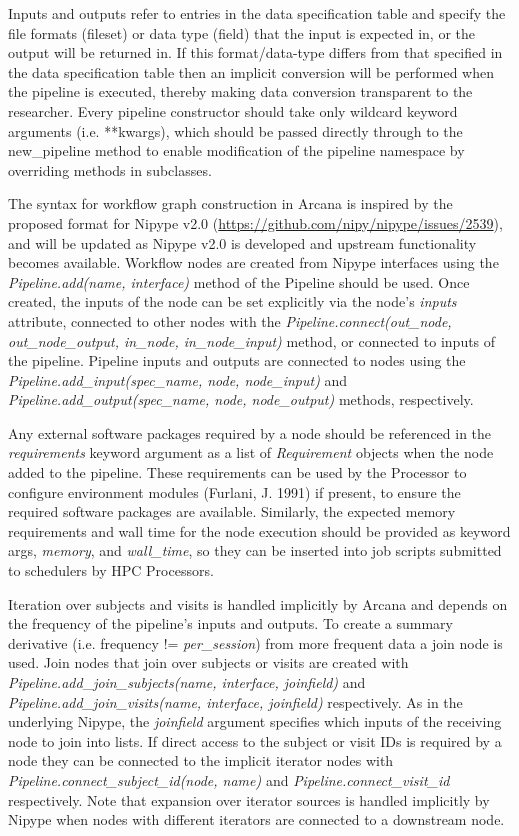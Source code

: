 Inputs and outputs refer to entries in the data specification table and
specify the file formats (fileset) or data type (field) that the input
is expected in, or the output will be returned in. If this
format/data-type differs from that specified in the data specification
table then an implicit conversion will be performed when the pipeline is
executed, thereby making data conversion transparent to the researcher.
Every pipeline constructor should take only wildcard keyword arguments
(i.e. **kwargs), which should be passed directly through to the
new\_pipeline method to enable modification of the pipeline namespace by
overriding methods in subclasses.

The syntax for workflow graph construction in Arcana is inspired by the
proposed format for Nipype v2.0
(\href{https://github.com/nipy/nipype/issues/2539}{{https://github.com/nipy/nipype/issues/2539}}),
and will be updated as Nipype v2.0 is developed and upstream
functionality becomes available. Workflow nodes are created from Nipype
interfaces using the \emph{Pipeline.add(name, interface)} method of the
Pipeline should be used. Once created, the inputs of the node can be set
explicitly via the node's \emph{inputs} attribute, connected to other
nodes with the \emph{Pipeline.connect(out\_node, out\_node\_output,
in\_node, in\_node\_input)} method, or connected to inputs of the
pipeline. Pipeline inputs and outputs are connected to nodes using the
\emph{Pipeline.add\_input(spec\_name, node, node\_input)} and
\emph{Pipeline.add\_output(spec\_name, node, node\_output)} methods,
respectively.

Any external software packages required by a node should be referenced
in the \emph{requirements} keyword argument as a list of
\emph{Requirement} objects when the node added to the pipeline. These
requirements can be used by the Processor to configure environment
modules (Furlani, J. 1991) if present, to ensure the required software
packages are available. Similarly, the expected memory requirements and
wall time for the node execution should be provided as keyword args,
\emph{memory}, and \emph{wall\_time}, so they can be inserted into job
scripts submitted to schedulers by HPC Processors.

Iteration over subjects and visits is handled implicitly by Arcana and
depends on the frequency of the pipeline's inputs and outputs. To create
a summary derivative (i.e. frequency != \emph{per\_session}) from more
frequent data a join node is used. Join nodes that join over subjects or
visits are created with \emph{Pipeline.add}\_\emph{join\_subjects(name,
interface, joinfield)} and \emph{Pipeline.add\_join\_visits(name,
interface, joinfield)} respectively. As in the underlying Nipype, the
\emph{joinfield} argument specifies which inputs of the receiving node
to join into lists. If direct access to the subject or visit IDs is
required by a node they can be connected to the implicit iterator nodes
with \emph{Pipeline.connect\_subject\_id(node, name)} and
\emph{Pipeline.connect\_visit\_id} respectively. Note that expansion
over iterator sources is handled implicitly by Nipype when nodes with
different iterators are connected to a downstream node.

